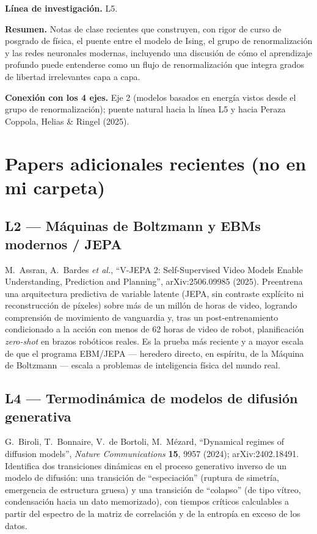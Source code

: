 \documentclass[12pt]{article}
\begin{document}
\textbf{Línea de investigación.} L5.

\textbf{Resumen.} Notas de clase recientes que construyen, con rigor de curso de posgrado de física, el puente entre el modelo de Ising, el grupo de renormalización y las redes neuronales modernas, incluyendo una discusión de cómo el aprendizaje profundo puede entenderse como un flujo de renormalización que integra grados de libertad irrelevantes capa a capa.

\textbf{Conexión con los 4 ejes.} Eje 2 (modelos basados en energía vistos desde el grupo de renormalización); puente natural hacia la línea L5 y hacia Peraza Coppola, Helias \& Ringel (2025).

\section{Papers adicionales recientes (no en mi carpeta)}

\subsection{L2 --- Máquinas de Boltzmann y EBMs modernos / JEPA}

\noindent M.~Assran, A.~Bardes \emph{et al.}, ``V-JEPA 2: Self-Supervised Video Models Enable Understanding, Prediction and Planning'', arXiv:2506.09985 (2025). \cite{assran2025}
Preentrena una arquitectura predictiva de variable latente (JEPA, sin contraste explícito ni reconstrucción de píxeles) sobre más de un millón de horas de video, logrando comprensión de movimiento de vanguardia y, tras un post-entrenamiento condicionado a la acción con menos de 62 horas de video de robot, planificación \emph{zero-shot} en brazos robóticos reales. Es la prueba más reciente y a mayor escala de que el programa EBM/JEPA --- heredero directo, en espíritu, de la Máquina de Boltzmann --- escala a problemas de inteligencia física del mundo real.

\subsection{L4 --- Termodinámica de modelos de difusión generativa}

\noindent G.~Biroli, T.~Bonnaire, V.~de Bortoli, M.~Mézard, ``Dynamical regimes of diffusion models'', \textit{Nature Communications} \textbf{15}, 9957 (2024); arXiv:2402.18491. \cite{biroli2024}
Identifica dos transiciones dinámicas en el proceso generativo inverso de un modelo de difusión: una transición de ``especiación'' (ruptura de simetría, emergencia de estructura gruesa) y una transición de ``colapso'' (de tipo vítreo, condensación hacia un dato memorizado), con tiempos críticos calculables a partir del espectro de la matriz de correlación y de la entropía en exceso de los datos.
\end{document}
